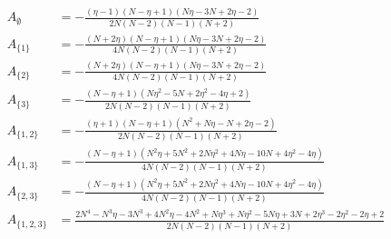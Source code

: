 \documentclass[11pt]{article}
\begin{document}
\begin{align*}
  A_{\emptyset} &= - \frac{\left(\eta - 1\right) \left(N - \eta + 1\right) \left(N \eta - 3 N + 2 \eta - 2\right)}{2 N \left(N - 2\right) \left(N - 1\right) \left(N + 2\right)} \\
  A_{\{1\}} &= - \frac{\left(N + 2 \eta\right) \left(N - \eta + 1\right) \left(N \eta - 3 N + 2 \eta - 2\right)}{4 N \left(N - 2\right) \left(N - 1\right) \left(N + 2\right)} \\
  A_{\{2\}} &= - \frac{\left(N + 2 \eta\right) \left(N - \eta + 1\right) \left(N \eta - 3 N + 2 \eta - 2\right)}{4 N \left(N - 2\right) \left(N - 1\right) \left(N + 2\right)} \\
  A_{\{3\}} &= - \frac{\left(N - \eta + 1\right) \left(N \eta^{2} - 5 N + 2 \eta^{2} - 4 \eta + 2\right)}{2 N \left(N - 2\right) \left(N - 1\right) \left(N + 2\right)} \\
  A_{\{1,2\}} &= - \frac{\left(\eta + 1\right) \left(N - \eta + 1\right) \left(N^{2} + N \eta - N + 2 \eta - 2\right)}{2 N \left(N - 2\right) \left(N - 1\right) \left(N + 2\right)} \\
  A_{\{1,3\}} &= - \frac{\left(N - \eta + 1\right) \left(N^{2} \eta + 5 N^{2} + 2 N \eta^{2} + 4 N \eta - 10 N + 4 \eta^{2} - 4 \eta\right)}{4 N \left(N - 2\right) \left(N - 1\right) \left(N + 2\right)} \\
  A_{\{2,3\}} &= - \frac{\left(N - \eta + 1\right) \left(N^{2} \eta + 5 N^{2} + 2 N \eta^{2} + 4 N \eta - 10 N + 4 \eta^{2} - 4 \eta\right)}{4 N \left(N - 2\right) \left(N - 1\right) \left(N + 2\right)} \\
  A_{\{1,2,3\}} &= \frac{2 N^{4} - N^{3} \eta - 3 N^{3} + 4 N^{2} \eta - 4 N^{2} + N \eta^{3} + N \eta^{2} - 5 N \eta + 3 N + 2 \eta^{3} - 2 \eta^{2} - 2 \eta + 2}{2 N \left(N - 2\right) \left(N - 1\right) \left(N + 2\right)} 
\end{align*}
\end{document}
